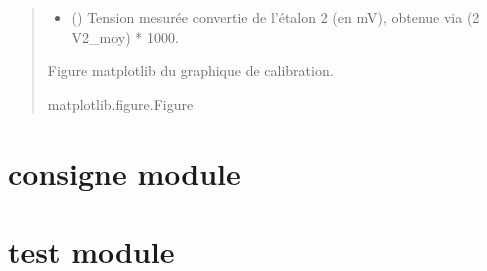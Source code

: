 \documentclass[letterpaper,10pt,english]{sphinxmanual}
\begin{document}
\begin{fulllineitems}
\begin{quote}
\begin{description}
\begin{itemize}
\item {} 
\sphinxAtStartPar
{} () \textendash{} Tension mesurée convertie de l’étalon 2 (en mV),
obtenue via (2 \sphinxhyphen{} V2\_moy) * 1000.

\end{itemize}

\sphinxAtStartPar
Figure matplotlib du graphique de calibration.

\sphinxAtStartPar
matplotlib.figure.Figure

\end{description}\end{quote}

\end{fulllineitems}


\sphinxstepscope


\section{consigne module}
\label{\detokenize{consigne:consigne-module}}\label{\detokenize{consigne::doc}}
\sphinxstepscope


\section{test module}
\label{\detokenize{test:module-test}}\label{\detokenize{test:test-module}}\label{\detokenize{test::doc}}
\end{document}
